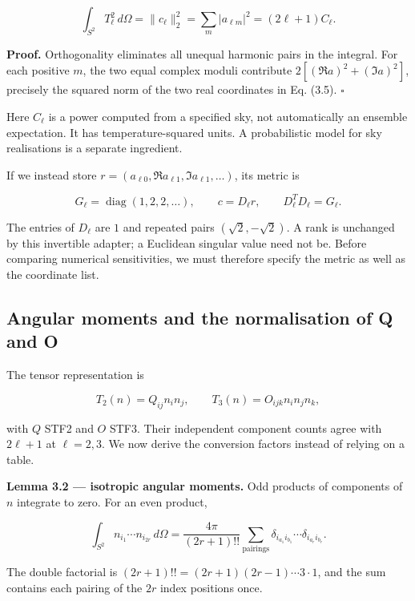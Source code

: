 \documentclass[
  11pt,
  a4paper]{article}
\begin{document}
\[
\int_{S^2}T_\ell^2\,d\Omega
=\|c_\ell\|_2^2
=\sum_m|a_{\ell m}|^2
=(2\ell+1)C_\ell.
\tag{3.6}
\]

\textbf{Proof.} Orthogonality eliminates all unequal harmonic pairs in the integral. For each positive \(m\), the two equal complex moduli contribute \(2[(\Re a)^2+(\Im a)^2]\), precisely the squared norm of the two real coordinates in Eq. (3.5). \(\square\)

Here \(C_\ell\) is a power computed from a specified sky, not automatically an ensemble expectation. It has temperature-squared units. A probabilistic model for sky realisations is a separate ingredient.

If we instead store \(r=(a_{\ell0},\Re a_{\ell1},\Im a_{\ell1},\ldots)\), its metric is

\[
G_\ell=\operatorname{diag}(1,2,2,\ldots),\qquad
c=D_\ell r,\qquad D_\ell^TD_\ell=G_\ell.
\tag{3.7}
\]

The entries of \(D_\ell\) are \(1\) and repeated pairs \((\sqrt2,-\sqrt2)\). A rank is unchanged by this invertible adapter; a Euclidean singular value need not be. Before comparing numerical sensitivities, we must therefore specify the metric as well as the coordinate list.

\hypertarget{angular-moments-and-the-normalisation-of-q-and-o}{%
\subsection{Angular moments and the normalisation of Q and O}\label{angular-moments-and-the-normalisation-of-q-and-o}}

The tensor representation is

\[
T_2(n)=Q_{ij}n_in_j,\qquad
T_3(n)=O_{ijk}n_in_jn_k,
\tag{3.8}
\]

with \(Q\) STF2 and \(O\) STF3. Their independent component counts agree with \(2\ell+1\) at \(\ell=2,3\). We now derive the conversion factors instead of relying on a table.

\textbf{Lemma 3.2 --- isotropic angular moments.} Odd products of components of \(n\) integrate to zero. For an even product,

\[
\int_{S^2} n_{i_1}\cdots n_{i_{2r}}\,d\Omega
=\frac{4\pi}{(2r+1)!!}
\sum_{\text{pairings}}\delta_{i_{a_1}i_{b_1}}\cdots
\delta_{i_{a_r}i_{b_r}}.
\tag{3.9}
\]

The double factorial is \((2r+1)!!=(2r+1)(2r-1)\cdots3\cdot1\), and the sum contains each pairing of the \(2r\) index positions once.
\end{document}
